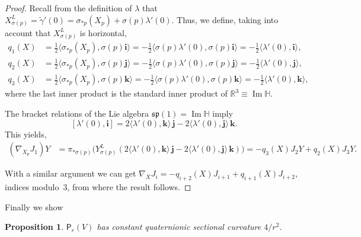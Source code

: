 \documentclass[12pt, a4paper]{amsart}
\newcommand{\g}{\mathfrak}
\newcommand{\R}{\mathbb{R}}
\renewcommand{\H}{\mathbb{H}}
\renewcommand{\Im}{\operatorname{Im}}
\newtheorem{proposition}[theorem]{Proposition}
\theoremstyle{remark}
\begin{document}
\begin{proof}
Recall from the definition of $\lambda$ that 
$X_{\sigma(p)}^L=\tilde{\gamma}'(0)=\sigma_{*p}(X_p)+\sigma(p)\lambda'(0)$.
Thus, we define, taking into account that $X_{\sigma(p)}^L$ is horizontal,
\[
\begin{aligned}
q_1(X)&{}=\frac{1}{2}\langle\sigma_{*p}(X_p),\sigma(p)\mathbf{i}\rangle
=-\frac{1}{2}\langle \sigma(p)\lambda'(0),\sigma(p)\mathbf{i}\rangle
=-\frac{1}{2}\langle \lambda'(0),\mathbf{i}\rangle,\\
q_2(X)&{}=\frac{1}{2}\langle\sigma_{*p}(X_p),\sigma(p)\mathbf{j}\rangle
=-\frac{1}{2}\langle \sigma(p)\lambda'(0),\sigma(p)\mathbf{j}\rangle
=-\frac{1}{2}\langle \lambda'(0),\mathbf{j}\rangle,\\
q_3(X)&{}=\frac{1}{2}\langle\sigma_{*p}(X_p),\sigma(p)\mathbf{k}\rangle
=-\frac{1}{2}\langle \sigma(p)\lambda'(0),\sigma(p)\mathbf{k}\rangle
=-\frac{1}{2}\langle \lambda'(0),\mathbf{k}\rangle,
\end{aligned}
\]
where the last inner product is the standard inner product of $\R^3\equiv\Im\H$.

The bracket relations of the Lie algebra $\g{sp}(1)=\Im\H$ imply
\[
[\lambda'(0),\mathbf{i}]
=2\langle\lambda'(0),\mathbf{k}\rangle\,\mathbf{j}-2\langle\lambda'(0),\mathbf{j}\rangle\,\mathbf{k}.
\]
This yields,
\[
\begin{aligned}
(\nabla_{X_p}J_1)Y
&{}=\pi_{*\sigma(p)}\bigl(Y_{\sigma(p)}^L(2\langle\lambda'(0),\mathbf{k}\rangle\,\mathbf{j}-2\langle\lambda'(0),\mathbf{j}\rangle\,\mathbf{k})\bigr)
=-q_3(X)J_2 Y+q_2(X)J_3 Y.
\end{aligned}
\]

With a similar argument we can get $\nabla_X J_i=-q_{i+2}(X)J_{i+1}+q_{i+1}(X)J_{i+2}$, indices modulo~3, from where the result follows.
\end{proof}

Finally we show

\begin{proposition}
$\mathsf{P}_r(V)$ has constant quaternionic sectional curvature $4/r^2$.
\end{proposition}
\end{document}
